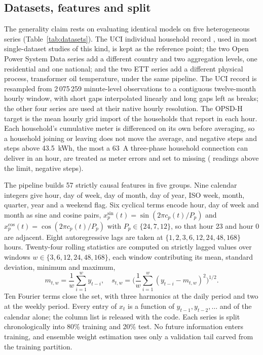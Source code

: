 \documentclass[journal]{IEEEtran}
\begin{document}
\subsection{Datasets, features and split}
The generality claim rests on evaluating identical models on five heterogeneous series (Table~\ref{tab:datasets}). The UCI individual household record \cite{r29}, used in most single-dataset studies of this kind, is kept as the reference point; the two Open Power System Data series \cite{r28} add a different country and two aggregation levels, one residential and one national; and the two ETT series \cite{r16} add a different physical process, transformer oil temperature, under the same pipeline. The UCI record is resampled from 2\,075\,259 minute-level observations to a contiguous twelve-month hourly window, with short gaps interpolated linearly and long gaps left as breaks; the other four series are used at their native hourly resolution. The OPSD-H target is the mean hourly grid import of the households that report in each hour. Each household's cumulative meter is differenced on its own before averaging, so a household joining or leaving does not move the average, and negative steps and steps above 43.5~kWh, the most a 63~A three-phase household connection can deliver in an hour, are treated as meter errors and set to missing (\nRemovedBig{} readings above the limit, \nRemovedNeg{} negative steps).

The pipeline builds 57 strictly causal features in five groups. Nine calendar integers give hour, day of week, day of month, day of year, ISO week, month, quarter, year and a weekend flag. Six cyclical terms encode hour, day of week and month as sine and cosine pairs, $x^{\sin}_{p}(t) = \sin(2\pi c_p(t)/P_p)$ and $x^{\cos}_{p}(t) = \cos(2\pi c_p(t)/P_p)$ with $P_p \in \{24,7,12\}$, so that hour 23 and hour 0 are adjacent. Eight autoregressive lags are taken at $\{1,2,3,6,12,24,48,168\}$ hours. Twenty-four rolling statistics are computed on strictly lagged values over windows $w \in \{3,6,12,24,48,168\}$, each window contributing its mean, standard deviation, minimum and maximum,
\begin{equation}
m_{t,w} = \frac{1}{w}\sum_{i=1}^{w} y_{t-i}, \quad
s_{t,w} = \Bigg(\frac{1}{w}\sum_{i=1}^{w} \left(y_{t-i} - m_{t,w}\right)^2\Bigg)^{\!1/2}.
\label{eq:rolling}
\end{equation}
Ten Fourier terms close the set, with three harmonics at the daily period and two at the weekly period. Every entry of $x_t$ is a function of $y_{t-1}, y_{t-2}, \ldots$ and of the calendar alone; the column list is released with the code. Each series is split chronologically into 80\% training and 20\% test. No future information enters training, and ensemble weight estimation uses only a validation tail carved from the training partition.
\end{document}

